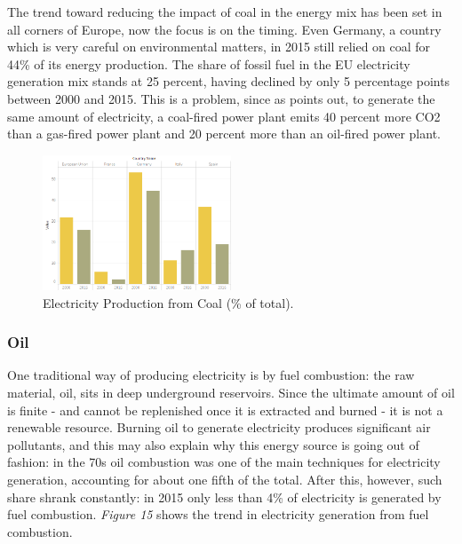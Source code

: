 \documentclass{book}
\begin{document}
The trend toward reducing the impact of coal in the energy mix has been set in all corners of Europe, now the focus is on the timing. Even Germany, a country which is very careful on environmental matters, in 2015 still relied on coal for 44\% of its energy production. The share of fossil fuel in the EU electricity generation mix stands at 25 percent, having declined by only 5 percentage points between 2000 and 2015. This is a problem, since as \cite{tagliapietra2017beyond} points out, to generate the same amount of electricity, a coal-fired power plant emits 40 percent more CO2 than a gas-fired power plant and 20 percent more than an oil-fired power plant.

\bigskip
\begin{figure}[H]
\begin{center}
\captionsetup{justification=centering}
\includegraphics[width=0.5\textwidth]{Images/coal.png}
\caption{Electricity Production from Coal (\% of total). }
\end{center}
\end{figure}
\bigskip

\subsubsection*{Oil}

One traditional way of producing electricity is by fuel combustion: the raw material, oil, sits in deep underground reservoirs. Since the ultimate amount of oil is finite - and cannot be replenished once it is extracted and burned - it is not a renewable resource. Burning oil to generate electricity produces significant air pollutants, and this may also explain why this energy source is going out of fashion: in the 70s oil combustion was one of the main techniques for electricity generation, accounting for about one fifth of the total. After this, however, such share shrank constantly: in 2015 only less than 4\% of electricity is generated by fuel combustion. \textit{Figure 15} shows the trend in electricity generation from fuel combustion.
\end{document}
